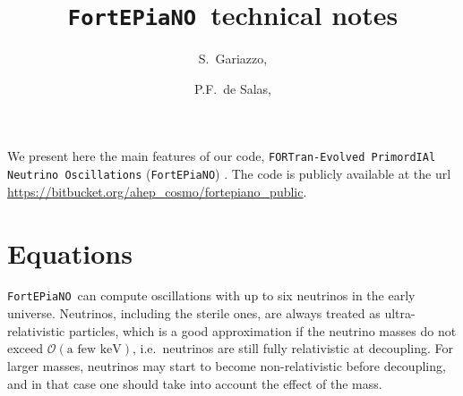 \documentclass[notitlepage,showpacs,preprintnumbers,amsmath,amssymb,superscriptaddress,prd,onecolumn]{revtex4-1}
\newcommand{\fortepiano}{\texttt{FortEPiaNO}}
\begin{document}
\title{\boldmath \fortepiano\ technical notes}

\author{S.\ Gariazzo,}

\author{P.F.\ de Salas,}



\maketitle

We present here the main features of
our code, \texttt{FORTran-Evolved PrimordIAl Neutrino Oscillations}
(\fortepiano) \cite{Gariazzo:2019gyi}.
The code is publicly available at the url
\url{https://bitbucket.org/ahep_cosmo/fortepiano_public}.

\section{Equations}
\fortepiano\ can compute oscillations with up to six neutrinos in the early universe.
Neutrinos, including the sterile ones, are always treated as ultra-relativistic particles, which is a good approximation if the
neutrino masses do not exceed $\mathcal{O}(\mbox{a few keV})$,
i.e.\ neutrinos are still fully relativistic at decoupling.
For larger masses, neutrinos may start to become non-relativistic before decoupling,
and in that case one should take into account the effect of the mass.
\end{document}
